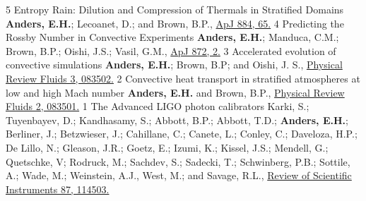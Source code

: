 	  {5}
	  {Entropy Rain: Dilution and Compression of Thermals in Stratified Domains}
	  {
		  \textbf{Anders, E.H.}; Lecoanet, D.; and Brown, B.P., 
		  \href{https://iopscience.iop.org/article/10.3847/1538-4357/ab3644}{ApJ 884, 65.}
	  }
\cvpub{}
	  {4}
	  {Predicting the Rossby Number in Convective Experiments}
	  {
		  \textbf{Anders, E.H.}; Manduca, C.M.; Brown, B.P.; Oishi, J.S.; Vasil, G.M., 
		  \href{https://iopscience.iop.org/article/10.3847/1538-4357/aaff61}{ApJ 872, 2.}
	  }
	  {3}
	  {Accelerated evolution of convective simulations}
	  {
		  \textbf{Anders, E.H.}; Brown, B.P; and Oishi, J. S.,
		  \href{https://journals.aps.org/prfluids/abstract/10.1103/PhysRevFluids.3.083502}{Physical Review Fluids 3, 083502.}
	  }
	  {2}
	  {Convective heat transport in stratified atmospheres at low and high Mach number}
	  {
		  \textbf{Anders, E.H.} and Brown, B.P.,
		  \href{https://journals.aps.org/prfluids/abstract/10.1103/PhysRevFluids.2.083501}{Physical Review Fluids 2, 083501.}
	  }
	  {1}
	  {The Advanced LIGO photon calibrators}
	  {
			Karki, S.; Tuyenbayev, D.; Kandhasamy, S.; Abbott, B.P.; Abbott, T.D.; \textbf{Anders, E.H.};
			Berliner, J.; Betzwieser, J.; Cahillane, C.; Canete, L.; Conley, C.; Daveloza, H.P.; De Lillo, N.;
			Gleason, J.R.; Goetz, E.; Izumi, K.; Kissel, J.S.; Mendell, G.; Quetschke, V; Rodruck, M.; Sachdev, S.;
			Sadecki, T.; Schwinberg, P.B.; Sottile, A.; Wade, M.; Weinstein, A.J., West, M.; and Savage, R.L.,
			\href{https://aip.scitation.org/doi/10.1063/1.4967303}{Review of Scientific Instruments 87, 114503.}
	  }
